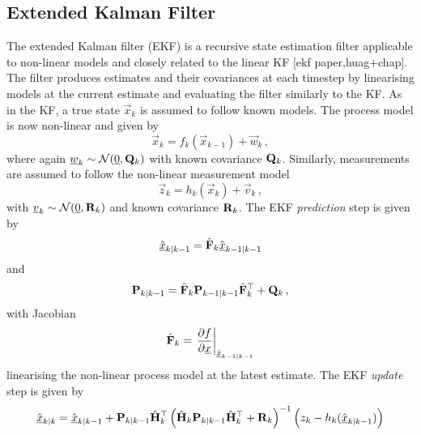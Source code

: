 % 
% 

\subsection{Extended Kalman Filter}\label{subsec:prelims:ekf}
The extended Kalman filter (EKF) is a recursive state estimation filter applicable to non-linear models and closely related to the linear KF [ekf paper,huag+chap]. The filter produces estimates and their covariances at each timestep by linearising models at the current estimate and evaluating the filter similarly to the KF. As in the KF, a true state $\vec{x}_k$ is assumed to follow known models. The process model is now non-linear and given by
\begin{equation}\label{eq:prelims:nonlin_gauss_process_model}
    \vec{x}_k = f_k(\vec{x}_{k-1}) + \vec{w}_k\,,
\end{equation}
where again ${\underline{w}}_k \sim \mathcal{N}({\underline{0}}, {{\mathbf{Q}}}_k)$ with known covariance ${{\mathbf{Q}}}_k$. Similarly, measurements are assumed to follow the non-linear measurement model
\begin{equation}\label{eq:prelims:nonlin_gauss_measurement_model}
    \vec{z}_k = h_k(\vec{x}_k) + \vec{v}_k\,,
\end{equation}
with ${\underline{v}}_k \sim \mathcal{N}({\underline{0}}, {{\mathbf{R}}}_k)$ and known covariance ${{\mathbf{R}}}_k$. The EKF \textit{prediction} step is given by
\begin{equation}\label{eq:prelims:ekf_est_predict}
    \hat{{\underline{x}}}_{k|k-1} = \hat{{{\mathbf{F}}}}_k \hat{{\underline{x}}}_{k-1|k-1}
\end{equation}
and
\begin{equation}\label{eq:prelims:ekf_cov_predict}
    {\ensuremath{{\mathbf{P}}}}_{k|k-1} = \hat{{{\mathbf{F}}}}_k {{\mathbf{P}}}_{k-1|k-1} \hat{{{\mathbf{F}}}}_k^\top + {{\mathbf{Q}}}_k\,,
\end{equation}
with Jacobian
\begin{equation}\label{eq:prelims:ekf_predict_jacobian}
    \hat{{{\mathbf{F}}}}_k = \left.\frac{\partial f}{\partial {\underline{x}}}\right|_{\hat{{\underline{x}}}_{k-1|k-1}}
\end{equation}
linearising the non-linear process model at the latest estimate. The EKF \textit{update} step is given by
\begin{equation}\label{eq:prelims:ekf_est_update}
    \hat{{\underline{x}}}_{k|k} = \hat{{\underline{x}}}_{k|k-1}+{{\mathbf{P}}}_{k|k-1}\hat{{{\mathbf{H}}}}_k^\top\left(\hat{{{\mathbf{H}}}}_k{{\mathbf{P}}}_{k|k-1}\hat{{{\mathbf{H}}}}_k^\top + {{\mathbf{R}}}_k\right)^{-1}\left(z_k-h_k(\hat{{\underline{x}}}_{k|k-1})\right)
\end{equation}
